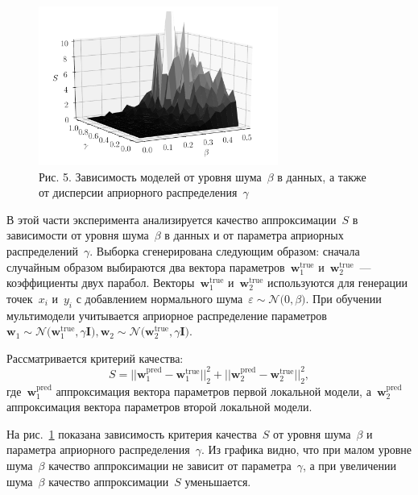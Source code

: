 \documentclass[12pt]{a&t}
\begin{document}
\begin{figure}[h!t]
\begin{center}
    \includegraphics[width=0.7\textwidth]{3dplot}
\end{center}
\caption{Рис. 5. Зависимость моделей от уровня шума~$\beta$ в данных, а также от дисперсии априорного распределения~$\gamma$}
\label{ce:fig5}
\end{figure}

В этой части эксперимента анализируется качество аппроксимации~$S$ в зависимости от уровня шума~$\beta$ в данных и от параметра априорных распределений~$\gamma$. Выборка сгенерирована следующим образом: сначала случайным образом выбираются два вектора параметров~$\mathbf{w}^\text{true}_{1}$ и~$\mathbf{w}^\text{true}_{2}$~--- коэффициенты двух парабол. Векторы~$\mathbf {w}^\text {true}_{1}$ и~$\mathbf{w}^\text {true}_{2}$ используются для генерации точек~$x_i$ и~$y_i$ с добавлением нормального шума~$\varepsilon\sim\mathcal {N} \bigr(0,\beta\bigr)$.
При обучении мультимодели учитывается априорное распределение параметров~$\mathbf{w}_1\sim\mathcal{N}\bigr(\mathbf{w}^\text{true}_{1}, \gamma \mathbf{I}\bigr),\mathbf{w}_2\sim\mathcal{N}\bigr(\mathbf{w}^\text{true}_{2}, \gamma\mathbf{I}\bigr)$.

Рассматривается критерий качества:
\[
S = ||\mathbf{w}^\text{pred}_{1} - \mathbf{w}^\text{true}_{1}||^{2}_{2} + ||\mathbf{w}^\text{pred}_{2} - \mathbf{w}^\text{true}_{2}||^{2}_{2},
\]
где~$\mathbf{w}^\text{pred}_{1}$ аппроксимация вектора параметров первой локальной модели, а~$\mathbf{w}^\text{pred}_{2}$ аппроксимация вектора параметров второй локальной модели.

На рис.~\ref{ce:fig5} показана зависимость критерия качества~$S$ от уровня шума~$\beta$ и параметра априорного распределения~$\gamma$. Из графика видно, что при малом уровне шума~$\beta$ качество аппроксимации не зависит от параметра~$\gamma$, а при увеличении шума~$\beta$ качество аппроксимации~$ S$ уменьшается.
\end{document}
